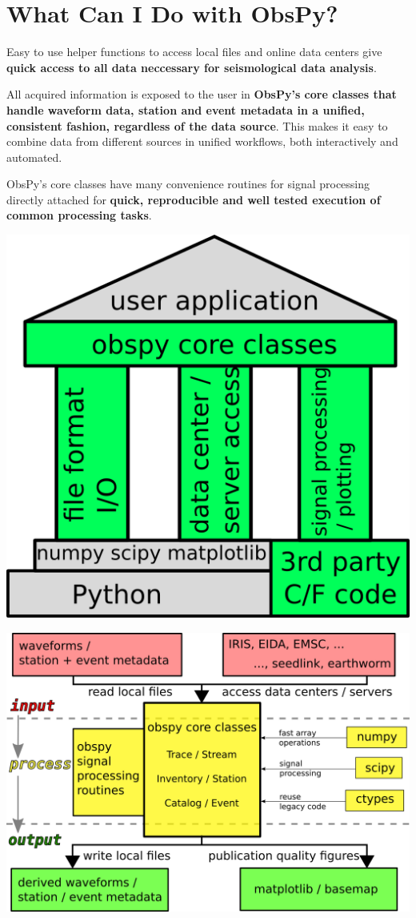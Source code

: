 \section*{What Can I Do with ObsPy?}
\begin{multicols}{2}
Easy to use helper functions to access local files and online data centers give
\textbf{quick access to all data neccessary for seismological data analysis}.

All acquired information is exposed to
the user in \textbf{ObsPy's core classes that handle waveform data, station and event
metadata in a unified, consistent fashion, regardless of the data source}. This makes it easy to
combine data from different sources in unified workflows, both interactively and
automated.

ObsPy's core classes have many convenience routines for signal processing
directly attached for \textbf{quick, reproducible and well tested execution of
common processing tasks}.
\columnbreak
\begin{center}
\includegraphics[width=0.65\columnwidth]{./images/obspy_pillars.png} \\
\end{center}
\end{multicols}
\vspace{\MyBoxVSep}

\begin{center}
\includegraphics[width=0.764\columnwidth]{./images/obspy_workflow.png} \\
\end{center}
